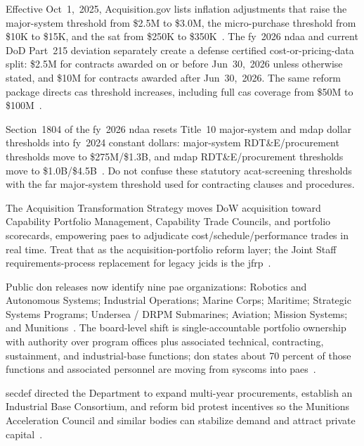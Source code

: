 \documentclass[../main.tex]{subfiles}
\begin{document}
\begin{description}[style=nextline,labelsep=0.5em,font=\bfseries]
  \item[\textbf{Threshold changes.}] Effective Oct~1,~2025, Acquisition.gov lists inflation adjustments that raise the major-system threshold from \$2.5M to \$3.0M, the micro-purchase threshold from \$10K to \$15K, and the \ac{sat} from \$250K to \$350K~\autocite{AcquisitionGov-Threshold-Changes-2025}. The \ac{fy}~2026 \ac{ndaa} and current DoD Part~215 deviation separately create a defense certified cost-or-pricing-data split: \$2.5M for contracts awarded on or before Jun~30,~2026 unless otherwise stated, and \$10M for contracts awarded after Jun~30,~2026. The same reform package directs \ac{cas} threshold increases, including full \ac{cas} coverage from \$50M to \$100M~\autocite{FY2026-NDAA,DFARS-Part215-Deviation-2026}.
  \item[\textbf{ACAT/MDAP limits.}] Section~1804 of the \ac{fy}~2026 \ac{ndaa} resets Title~10 major-system and \ac{mdap} dollar thresholds into \ac{fy}~2024 constant dollars: major-system RDT\&E/procurement thresholds move to \$275M/\$1.3B, and \ac{mdap} RDT\&E/procurement thresholds move to \$1.0B/\$4.5B~\autocite{FY2026-NDAA}. Do not confuse these statutory \ac{acat}-screening thresholds with the \ac{far} major-system threshold used for contracting clauses and procedures.
  \item[\textbf{WAS.}] The Acquisition Transformation Strategy moves DoW acquisition toward Capability Portfolio Management, Capability Trade Councils, and portfolio scorecards, empowering \acp{pae} to adjudicate cost/schedule/performance trades in real time. Treat that as the acquisition-portfolio reform layer; the Joint Staff requirements-process replacement for legacy \ac{jcids} is the \ac{jfrp}~\autocite{secwar-acq-transformation-2025,secwar-jcids-reform-2025,CJCSM5123-01}.
  \item[\textbf{New Navy PAEs.}] Public \ac{don} releases now identify nine \ac{pae} organizations: Robotics and Autonomous Systems; Industrial Operations; Marine Corps; Maritime; Strategic Systems Programs; Undersea / DRPM Submarines; Aviation; Mission Systems; and Munitions~\autocite{DON-PAE-Establishment-2026,DON-PAE-Expansion-May2026}. The board-level shift is single-accountable portfolio ownership with authority over program offices plus associated technical, contracting, sustainment, and industrial-base functions; \ac{don} states about 70 percent of those functions and associated personnel are moving from \acp{syscom} into \acp{pae}~\autocite{DON-PAE-Expansion-May2026}.
  \item[\textbf{Industrial base actions.}] \ac{secdef} directed the Department to expand multi-year procurements, establish an Industrial Base Consortium, and reform bid protest incentives so the Munitions Acceleration Council and similar bodies can stabilize demand and attract private capital~\autocite{secwar-acq-transformation-2025}.

\end{description}
\end{document}
